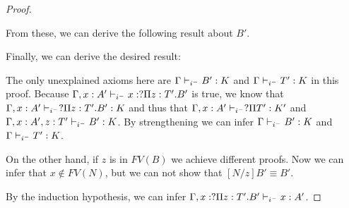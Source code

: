 \begin{proof}
\begin{prooftree}
\end{prooftree}

\begin{prooftree}
\end{prooftree}

From these, we can derive the following result about $B'$.

\begin{prooftree}



\end{prooftree}

Finally, we can derive the desired result:

\begin{prooftree}



\end{prooftree}

The only unexplained axioms here are 
$\Gamma \judgeCI B': K$ and $\Gamma \judgeCI T' : K$ in this proof.
Because $\Gamma, x : A' \judgeCI x : ?\Pi z:T' . B'$ is true, we know that 
$\Gamma, x : A' \judgeCI ?\Pi z : T' . B' : K$ and thus that 
$\Gamma,x : A' \judgeCI ?\Pi T' : K' $ and $\Gamma, x : A', z : T' \judgeCI B' : K$.  
By strengthening we can infer $\Gamma \judgeCI B': K$ and $\Gamma \judgeCI T' : K$.


On the other hand, if $z$ is in $FV(B)$ we achieve different proofs.  
Now we can infer that $x \notin FV(N)$, but we can not show that $[N/z]B' \equiv B'$.

By the induction hypothesis, we can infer $\Gamma , x : ?\Pi z : T' . B'\judgeCI x : A'$.


\end{proof}
